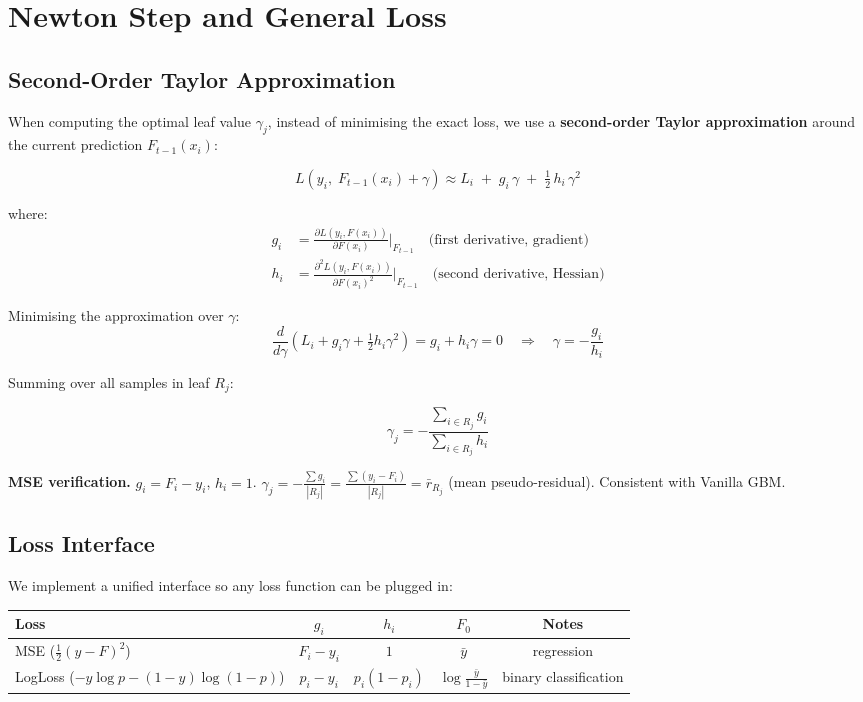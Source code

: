 \documentclass[11pt, a4paper]{article}
\begin{document}
\section{Newton Step and General Loss}
\label{sec:newton}

\subsection{Second-Order Taylor Approximation}

When computing the optimal leaf value $\gamma_j$, instead of minimising
the exact loss, we use a \textbf{second-order Taylor approximation} around
the current prediction $F_{t-1}(x_i)$:

\[
L\!\left(y_i,\; F_{t-1}(x_i) + \gamma\right)
\approx L_i \;+\; g_i\,\gamma \;+\; \tfrac{1}{2}\,h_i\,\gamma^2
\]

where:
\begin{align*}
g_i &= \frac{\partial L(y_i, F(x_i))}{\partial F(x_i)}\bigg|_{F_{t-1}}
       \quad\text{(first derivative, gradient)} \\
h_i &= \frac{\partial^2 L(y_i, F(x_i))}{\partial F(x_i)^2}\bigg|_{F_{t-1}}
       \quad\text{(second derivative, Hessian)}
\end{align*}

Minimising the approximation over $\gamma$:
\[
\frac{d}{d\gamma}\left(L_i + g_i\gamma + \tfrac{1}{2}h_i\gamma^2\right)
= g_i + h_i\gamma = 0
\quad\Rightarrow\quad \gamma = -\frac{g_i}{h_i}
\]

Summing over all samples in leaf $R_j$:

\[
\gamma_j = -\frac{\sum_{i \in R_j} g_i}{\sum_{i \in R_j} h_i}
\]

\textbf{MSE verification.}
$g_i = F_i - y_i$, $h_i = 1$.
$\gamma_j = -\frac{\sum g_i}{|R_j|} = \frac{\sum(y_i - F_i)}{|R_j|} = \bar{r}_{R_j}$ (mean pseudo-residual).
Consistent with Vanilla GBM.

\subsection{Loss Interface}

We implement a unified interface so any loss function can be plugged in:

\begin{center}
\begin{tabular}{lcccc}
\toprule
\textbf{Loss} & $g_i$ & $h_i$ & $F_0$ & Notes \\
\midrule
MSE ($\tfrac{1}{2}(y-F)^2$) & $F_i - y_i$ & $1$ & $\bar{y}$ & regression \\
LogLoss ($-y\log p-(1-y)\log(1-p)$) & $p_i - y_i$ & $p_i(1-p_i)$ & $\log\!\frac{\bar{y}}{1-\bar{y}}$ & binary classification \\
\bottomrule
\end{tabular}
\end{center}
\end{document}
